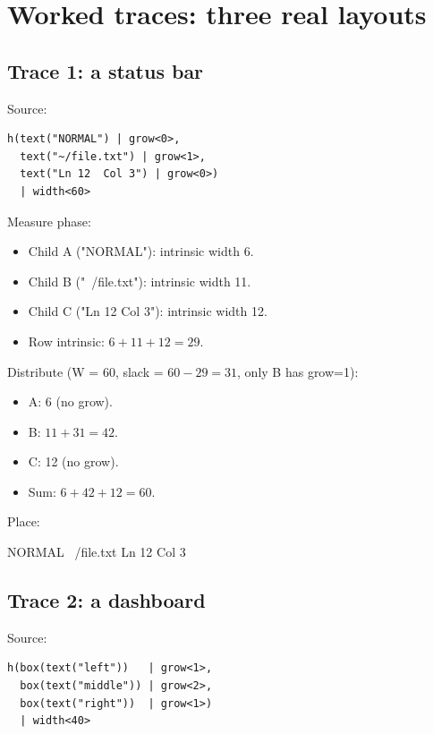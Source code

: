 \section{Worked traces: three real layouts}

\subsection*{Trace 1: a status bar}

Source:

\begin{lstlisting}
h(text("NORMAL") | grow<0>,
  text("~/file.txt") | grow<1>,
  text("Ln 12  Col 3") | grow<0>)
  | width<60>
\end{lstlisting}

Measure phase:

\begin{itemize}[leftmargin=*]
  \item Child A ("NORMAL"): intrinsic width 6.
  \item Child B ("~/file.txt"): intrinsic width 11.
  \item Child C ("Ln 12  Col 3"): intrinsic width 12.
  \item Row intrinsic: $6 + 11 + 12 = 29$.
\end{itemize}

Distribute (W = 60, slack = $60 - 29 = 31$, only B has grow=1):

\begin{itemize}[leftmargin=*]
  \item A: 6 (no grow).
  \item B: $11 + 31 = 42$.
  \item C: 12 (no grow).
  \item Sum: $6 + 42 + 12 = 60$. \checkmark
\end{itemize}

Place:

\begin{terminalbox}
NORMAL ~/file.txt                              Ln 12  Col 3
\end{terminalbox}

\subsection*{Trace 2: a dashboard}

Source:

\begin{lstlisting}
h(box(text("left"))   | grow<1>,
  box(text("middle")) | grow<2>,
  box(text("right"))  | grow<1>)
  | width<40>
\end{lstlisting}

